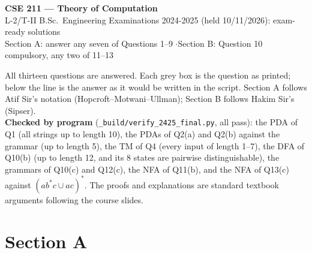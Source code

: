 \documentclass[10.5pt,a4paper]{article}
\begin{document}
\begin{center}
{\Large\bfseries\color{navy} CSE 211 --- Theory of Computation}\\[2pt]
{\large L-2/T-II B.Sc.\ Engineering Examinations 2024-2025 (held 10/11/2026): exam-ready solutions}\\[2pt]
{\small Section A: answer any seven of Questions 1--9 \quad$\cdot$\quad Section B: Question 10 compulsory, any two of 11--13}
\end{center}

\begin{tcolorbox}[colback=white,colframe=navy,boxrule=0.4pt,arc=1pt,left=6pt,right=6pt,top=3pt,bottom=3pt]
All thirteen questions are answered. Each grey box is the question as printed; below the line is the answer as it would be written in the
script. Section A follows Atif Sir's notation (Hopcroft--Motwani--Ullman); Section B follows Hakim Sir's (Sipser).\\[2pt]
\textbf{Checked by program} (\texttt{\_build/verify\_2425\_final.py}, all pass): the PDA of Q1 (all strings up to length 10), the PDAs of Q2(a)
and Q2(b) against the grammar (up to length 5), the TM of Q4 (every input of length 1--7), the DFA of Q10(b) (up to length 12, and its 8 states
are pairwise distinguishable), the grammars of Q10(c) and Q12(c), the NFA of Q11(b), and the NFA of Q13(c) against $(ab^*c\cup ac)^*$.
The proofs and explanations are standard textbook arguments following the course slides.
\end{tcolorbox}

\tableofcontents

\clearpage
\section*{Section A}
\end{document}
